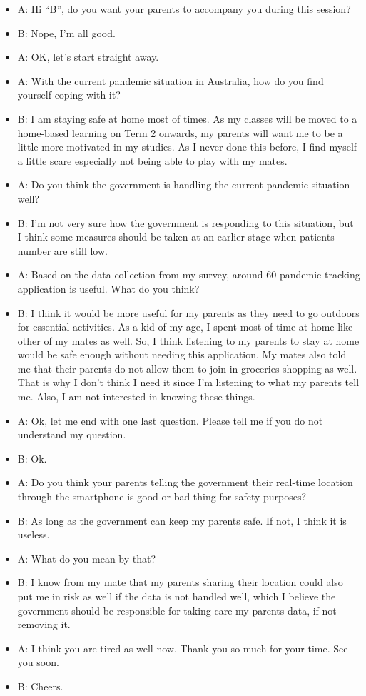   \begin{itemize}
    \item A: Hi “B”, do you want your parents to accompany you during this session?
    \item B: Nope, I’m all good.
    \item A: OK, let’s start straight away.
    \item A: With the current pandemic situation in Australia, how do you find yourself coping with it?
    \item B: I am staying safe at home most of times. As my classes will be moved to a home-based
learning on Term 2 onwards, my parents will want me to be a little more motivated in my
studies. As I never done this before, I find myself a little scare especially not being able to
play with my mates.
    \item A: Do you think the government is handling the current pandemic situation well?
    \item B: I’m not very sure how the government is responding to this situation, but I think some
measures should be taken at an earlier stage when patients number are still low.
    \item A: Based on the data collection from my survey, around 60%
pandemic tracking application is useful. What do you think?
    \item B: I think it would be more useful for my parents as they need to go outdoors for essential
activities. As a kid of my age, I spent most of time at home like other of my mates as well. So,
I think listening to my parents to stay at home would be safe enough without needing this
application. My mates also told me that their parents do not allow them to join in groceries
shopping as well. That is why I don’t think I need it since I’m listening to what my parents
tell me. Also, I am not interested in knowing these things.
    \item A: Ok, let me end with one last question. Please tell me if you do not understand my question.
    \item B: Ok.
    \item A: Do you think your parents telling the government their real-time location through the
smartphone is good or bad thing for safety purposes?
    \item B: As long as the government can keep my parents safe. If not, I think it is useless.
    \item A: What do you mean by that?
    \item B: I know from my mate that my parents sharing their location could also put me in risk as well
if the data is not handled well, which I believe the government should be responsible for taking
care my parents data, if not removing it.
    \item A: I think you are tired as well now. Thank you so much for your time. See you soon.
    \item B: Cheers.
  \end{itemize}

